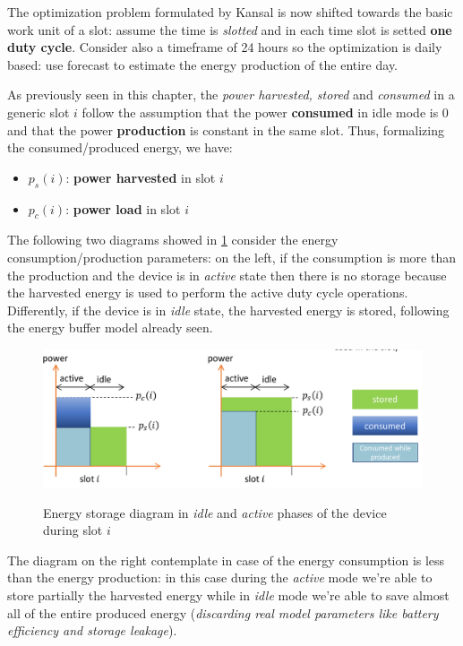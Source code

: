\documentclass[10pt,a4paper]{report}
\theoremstyle{definition}
\begin{document}
The optimization problem formulated by Kansal is now shifted towards the basic work unit of a slot: assume the time is \textit{slotted} and in each time slot is setted \textbf{one duty cycle}. Consider also a timeframe of 24 hours so the optimization is daily based: use forecast to estimate the energy production of the entire day.

As previously seen in this chapter, the \textit{power harvested, stored} and \textit{consumed} in a generic slot $i$ follow the assumption that the power \textbf{consumed} in idle mode is $0$ and that the power \textbf{production} is constant in the same slot. Thus, formalizing the consumed/produced energy, we have:
\begin{itemize}
	\item 
	$p_{s}(i)$: \textbf{power harvested} in slot $i$
	\item 
	$p_{c}(i)$: \textbf{power load} in slot $i$
\end{itemize}

The following two diagrams showed in \ref{storage-energy-diagram} consider the energy consumption/production parameters: on the left, if the consumption is more than the production and the device is in \textit{active} state then there is no storage because the harvested energy is used to perform the active duty cycle operations. Differently, if the device is in \textit{idle} state, the harvested energy is stored, following the energy buffer model already seen.
\begin{figure}[h]
	\centering\includegraphics[scale=0.40]{images/Pasted image 20230509165631.png}
	\label{storage-energy-diagram}
	\caption{Energy storage diagram in \textit{idle} and \textit{active} phases of the device during slot $i$}
\end{figure}


The diagram on the right contemplate in case of the energy consumption is less than the energy production: in this case during the \textit{active} mode we're able to store partially the harvested energy while in \textit{idle} mode we're able to save almost all of the entire produced energy (\textit{discarding real model parameters like battery efficiency and storage leakage}).
\end{document}
